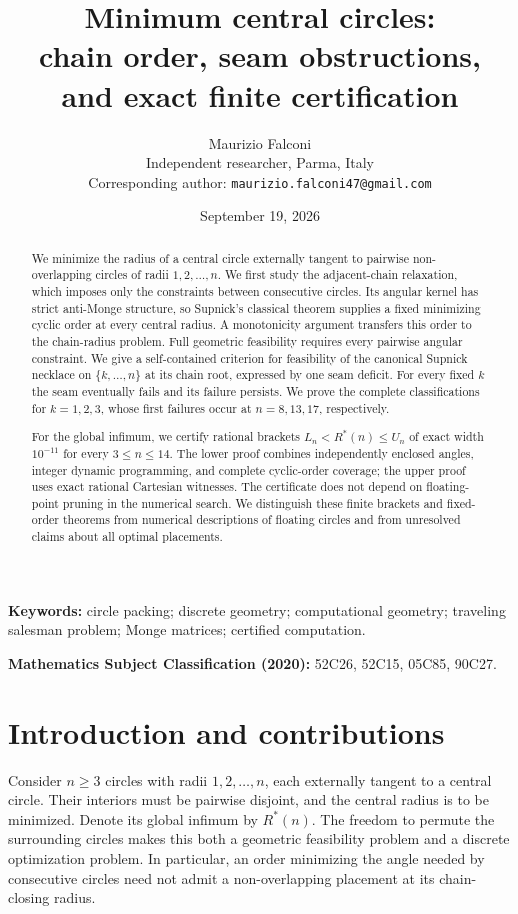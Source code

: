 \documentclass[11pt]{article}
\title{Minimum central circles:\\chain order, seam obstructions,\\and exact finite certification}
\author{Maurizio Falconi\\[3pt]\small Independent researcher, Parma, Italy\\
\small Corresponding author: \texttt{maurizio.falconi47@gmail.com}}
\date{September 19, 2026}
\theoremstyle{definition}
\theoremstyle{remark}
\newcommand{\Rstar}{R^*}
\begin{document}
\maketitle

\begin{abstract}
We minimize the radius of a central circle externally tangent to pairwise
non-overlapping circles of radii $1,2,\ldots,n$. We first study the
adjacent-chain relaxation, which imposes only the constraints between
consecutive circles. Its angular kernel has strict anti-Monge structure, so
Supnick's classical theorem supplies a fixed minimizing cyclic order at every
central radius. A monotonicity argument transfers this order to the
chain-radius problem. Full geometric feasibility requires every pairwise
angular constraint. We give a self-contained criterion for feasibility of the
canonical Supnick necklace on $\{k,\ldots,n\}$ at its chain root, expressed
by one seam deficit. For every fixed $k$ the seam eventually fails and its
failure persists. We prove the complete classifications for $k=1,2,3$, whose
first failures occur at $n=8,13,17$, respectively.

For the global infimum, we certify rational brackets
$L_n<R^*(n)\le U_n$ of exact width $10^{-11}$
for every $3\le n\le14$. The lower proof combines independently enclosed
angles, integer dynamic programming, and complete cyclic-order coverage;
the upper proof uses exact rational Cartesian witnesses. The certificate
does not depend on floating-point pruning in the numerical search. We
distinguish these
finite brackets and fixed-order theorems from numerical descriptions of
floating circles and from unresolved claims about all optimal placements.
\end{abstract}

\noindent\textbf{Keywords:} circle packing; discrete geometry; computational
geometry; traveling salesman problem; Monge matrices; certified computation.

\medskip\noindent\textbf{Mathematics Subject Classification (2020):}
52C26, 52C15, 05C85, 90C27.

\section{Introduction and contributions}
Consider $n\ge3$ circles with radii $1,2,\ldots,n$, each externally tangent
to a central circle. Their interiors must be pairwise disjoint, and the
central radius is to be minimized. Denote its global infimum by $\Rstar(n)$.
The freedom to permute the surrounding circles makes this both a geometric
feasibility problem and a discrete optimization problem. In particular,
an order minimizing the angle needed by consecutive circles need not
admit a non-overlapping placement at its chain-closing radius.
\end{document}
